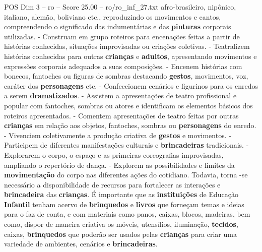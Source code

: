 \begin{textsample}{POS Dim 3 – ro – Score 25.00 – ro/ro\_inf\_27.txt}
afro-brasileiro, nipônico, italiano, alemão, boliviano etc., reproduzindo os movimentos e cantos, compreendendo o significado das indumentárias e das \textbf{pinturas} corporais utilizadas. - Construam em grupo roteiros para encenações feitas a partir de histórias conhecidas, situações improvisadas ou criações coletivas. - Teatralizem histórias conhecidas para outras \textbf{crianças} e \textbf{adultos}, apresentando movimentos e expressões corporais adequados a suas composições. - Encenem histórias com bonecos, fantoches ou figuras de sombras destacando \textbf{gestos}, movimentos, voz, caráter dos \textbf{personagens} etc. - Confeccionem cenários e figurinos para os enredos a serem \textbf{dramatizados}. - Assistem a apresentações de teatro profissional e popular com fantoches, sombras ou atores e identificam os elementos básicos dos roteiros apresentados. - Comentem apresentações de teatro feitas por outras \textbf{crianças} em relação aos objetos, fantoches, sombras ou \textbf{personagens} do enredo. - Vivenciem coletivamente a produção criativa de \textbf{gestos} e movimentos. - Participem de diferentes manifestações culturais e \textbf{brincadeiras} tradicionais. - Explorarem o corpo, o espaço e as primeiras coreografias improvisadas, ampliando o repertório de dança. - Explorem as possibilidades e limites da \textbf{movimentação} do corpo nas diferentes ações do cotidiano.
Todavia, torna -se necessário a disponibilidade de recursos para fortalecer as interações e \textbf{brincadeira} das \textbf{crianças}.
É importante que as \textbf{instituições} de Educação \textbf{Infantil} tenham acervo de \textbf{brinquedos} e \textbf{livros} que forneçam temas e ideias para o faz de conta, e com materiais como panos, caixas, blocos, madeiras, bem como, dispor de maneira criativa os móveis, utensílios, iluminação, \textbf{tecidos}, caixas, \textbf{brinquedos} que poderão ser usados pelas \textbf{crianças} para criar uma variedade de ambientes, cenários e \textbf{brincadeiras}.

\end{textsample}
